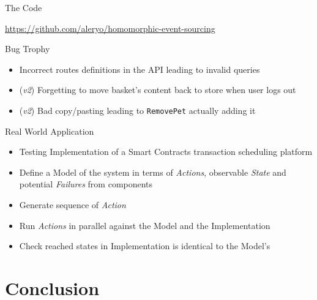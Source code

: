 \begin{frame}[fragile]{The Code}
  \begin{center}
  \url{https://github.com/aleryo/homomorphic-event-sourcing}
  \end{center}
\end{frame}

\begin{frame}[fragile]{Bug Trophy}
  \begin{itemize}[<+->]
  \item Incorrect routes definitions in the API leading to invalid queries
  \item (\emph{v2}) Forgetting to move basket's content back to store when user logs out
  \item (\emph{v2}) Bad copy/pasting leading to \texttt{RemovePet} actually adding it
  \end{itemize}
\end{frame}

\begin{frame}[fragile]{Real World Application}
  \begin{itemize}[<+->]
  \item Testing Implementation of a Smart Contracts transaction scheduling platform
  \item Define a Model of the system in terms of \emph{Actions}, observable \emph{State} and potential \emph{Failures} from components
  \item Generate sequence of \emph{Action}
  \item Run \emph{Actions} in parallel against the Model and the Implementation
  \item Check reached states in Implementation is identical to the Model's
  \end{itemize}
\end{frame}


\part{Conclusion}


